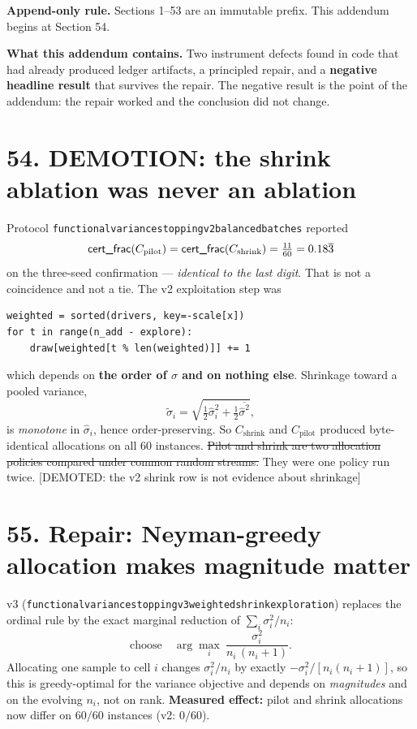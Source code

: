 \documentclass[9pt,twocolumn]{article}
\newcommand{\oldclaim}[1]{\sout{#1}}
\newcommand{\eclass}[1]{\textsf{[#1]}}
\renewcommand{\_}{\CIGunderscore\allowbreak}
\begin{document}
\sloppy
{}

\textbf{Append-only rule.} Sections 1--53 are an immutable prefix. This addendum begins at Section 54.

\textbf{What this addendum contains.} Two instrument defects found in code that had already produced ledger artifacts, a principled repair, and a \textbf{negative headline result} that survives the repair. The negative result is the point of the addendum: the repair worked and the conclusion did not change.

\section*{54. DEMOTION: the shrink ablation was never an ablation}
Protocol \texttt{functional\_variance\_stopping\_v2\_balanced\_batches} reported
\[\textsf{cert\_frac}(C_{\text{pilot}})=\textsf{cert\_frac}(C_{\text{shrink}})=\tfrac{11}{60}=0.18\overline{3}\]
on the three-seed confirmation --- \emph{identical to the last digit}. That is not a coincidence and not a tie. The v2 exploitation step was
\begin{verbatim}
weighted = sorted(drivers, key=-scale[x])
for t in range(n_add - explore):
    draw[weighted[t % len(weighted)]] += 1
\end{verbatim}
which depends on \textbf{the order of $\sigma$ and on nothing else}. Shrinkage toward a pooled variance,
\[\tilde\sigma_i=\sqrt{\tfrac12\hat\sigma_i^2+\tfrac12\overline{\hat\sigma^2}},\]
is \emph{monotone} in $\hat\sigma_i$, hence order-preserving. So $C_{\text{shrink}}$ and $C_{\text{pilot}}$ produced byte-identical allocations on all $60$ instances. \oldclaim{Pilot and shrink are two allocation policies compared under common random streams.} They were one policy run twice. \eclass{DEMOTED: the v2 shrink row is not evidence about shrinkage}

\section*{55. Repair: Neyman-greedy allocation makes magnitude matter}
v3 (\texttt{functional\_variance\_stopping\_v3\_weighted\_shrink\_exploration}) replaces the ordinal rule by the exact marginal reduction of $\sum_i \sigma_i^2/n_i$:
\[\text{choose}\quad \arg\max_i \ \frac{\sigma_i^2}{n_i\,(n_i+1)} .\]
Allocating one sample to cell $i$ changes $\sigma_i^2/n_i$ by exactly $-\sigma_i^2/[n_i(n_i+1)]$, so this is greedy-optimal for the variance objective and depends on \emph{magnitudes} and on the evolving $n_i$, not on rank. \textbf{Measured effect:} pilot and shrink allocations now differ on $60/60$ instances (v2: $0/60$).
\end{document}
